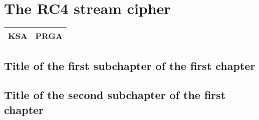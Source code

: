 \chapter{The RC4 stream cipher}

\begin{tabular}{|l|l|}
\hline
KSA & PRGA \\
\hline
\end{tabular}

\section{Title of the first subchapter of the first chapter}

\section{Title of the second subchapter of the first chapter}

